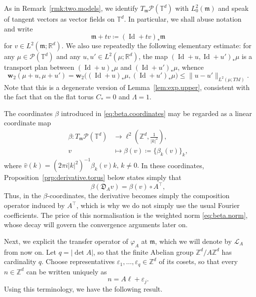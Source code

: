 \documentclass[11pt,reqno]{amsart}
\theoremstyle{plain}
\theoremstyle{definition}
\newcommand{\dw}{\mathbf{w}_2}
\newcommand{\T}{\mathbb{T}}
\newcommand{\Z}{\mathbb{Z}}
\newcommand{\R}{\mathbb{R}}
\newcommand{\Leb}{\mathfrak{m}}
\newcommand{\D}{\mathfrak{D}}
\newcommand{\lto}{\longrightarrow}
\newcommand{\Prob}{\mathcal{P}}
\newcommand{\Transf}{\mathcal{L}}
\DeclareMathOperator{\Id}{Id}
\begin{document}
As in Remark~\ref{rmk:two.models}, we identify \( T_\Leb\Prob(\T^d) \) with \( L^2_0(\Leb) \) and speak of tangent vectors as vector fields on \( \T^d \).
In particular, we shall abuse notation and write
\[
    \Leb+tv\coloneqq (\Id+tv)_\ast\Leb
\]
for \(v\in L^2(\Leb;\R^d)\).
We also use repeatedly the following elementary estimate: for any \( \mu\in \Prob(\T^d) \) and any \( u,u'\in L^2(\mu;\R^d) \), the map \( (\Id+u,\Id+u')_\ast \mu \) is a transport plan between \( (\Id+u)_\ast \mu \) and \( (\Id+u')_\ast \mu \), whence
\begin{equation}\label{eq:trivial.coupling}
    \dw(\mu + u, \mu + u') = \dw\big((\Id+u)_\ast \mu,(\Id+u')_\ast \mu\big)\le\lVert u-u' \rVert_{L^2(\mu; TM)} .
\end{equation}
Note that this is a degenerate version of Lemma~\ref{lem:exp.upper}, consistent with the fact that on the flat torus \(C_\ast = 0\) and \(\Lambda=1\).

The coordinates \(\beta\) introduced in \eqref{eq:beta.coordinates} may be regarded as a linear coordinate map
\begin{align*}
    \beta:T_\Leb \Prob(\T^d) & \lto  \ell^2\!\left(\Z^d,\frac{1}{\lvert k \rvert^2}\right), \\
    v                        & \longmapsto \beta(v) \coloneqq  \{\beta_k(v)\}_{k},
\end{align*}
where \(\widehat v(k)=(2\pi i\lvert k \rvert^2)^{-1}\beta_k(v)k, \, k\neq0.\)
In these coordinates, Proposition~\ref{prp:derivative.torus} below states simply that
\begin{equation}\label{eq:dynamical.equivariance}
    \beta(\D_Av)=\beta(v)\circ A^{\top},
\end{equation}
Thus, in the \(\beta\)-coordinates, the derivative becomes simply the composition operator induced by \(A^{\top}\), which is why we do not simply use the usual Fourier coefficients.
The price of this normalisation is the weighted norm \eqref{eq:beta.norm}, whose decay will govern the convergence arguments later on.

Next, we explicit the transfer operator of \(  \varphi_A  \) at \( \Leb \), which we will denote by \(\Transf_A\) from now on.
Let \(q=\lvert \det A \rvert\), so that the finite Abelian group \(\Z^d/A\Z^d\) has cardinality \(q\).
Choose representatives \(\varepsilon_1,\dots,\varepsilon_q\in\Z^d\) of its cosets, so that every \(n\in\Z^d\) can be written uniquely as
\[
    n=A\ell+\varepsilon_j.
\]
Using this terminology, we have the following result.
\end{document}
